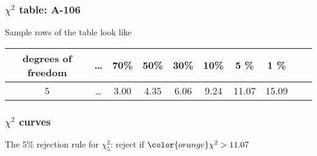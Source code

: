 \documentclass[handout]{beamer}
\begin{document}

   \begin{frame} \frametitle{$\chi^2$ table: A-106}

   \begin{block}
   {Sample rows of the table look like}
    \begin{tabular}{cccccccccc}
    {\tiny degrees of freedom} & \dots & {\tiny 70\%} & {\tiny 50\%} & {\tiny 30\%} & {\tiny 10\%} & {\tiny 5 \%} & {\tiny 1 \%} \\ \hline
   5 & \dots & 3.00 & 4.35 & 6.06 & 9.24 & 11.07 & 15.09 \\
    \end{tabular}
    \end{block}
   \end{frame}



   \begin{frame}
   \frametitle{$\chi^2$ curves}
   \begin{center}
   \end{center}
   The 5\% rejection rule for $\chi^2_5$: reject if ${\color{orange} \chi^2} > 11.07$
   \end{frame}


   \begin{frame} 

   \end{frame}

   
\end{document}

